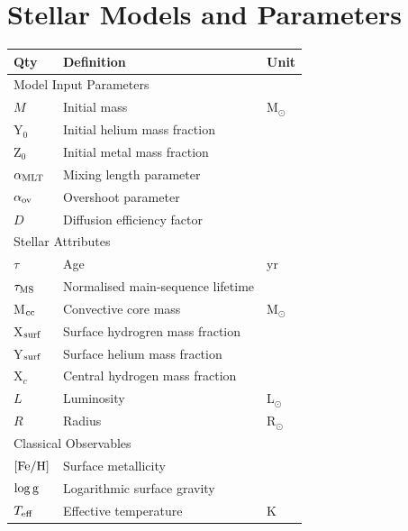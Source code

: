 \section{Stellar Models and Parameters}
\begin{table}
\centering
{
\renewcommand{\arraystretch}{1.2}
\centering
\begin{tabular}{lll} 
\hline \hline  
\textbf{Qty} & \textbf{Definition} & \textbf{Unit} \\ 
\hline
\multicolumn{3}{l}{Model Input Parameters} \\ 
$M$ & Initial mass & M$_{\odot}$ \\
Y$_0$ & Initial helium mass fraction & \\
Z$_0$ & Initial metal mass fraction & \\
$\alpha_{\rm{MLT}}$ & Mixing length parameter & \\
$\alpha_{\rm{ov}}$ & Overshoot parameter & \\ 
$D$ & Diffusion efficiency factor & \\[8pt] 
\multicolumn{3}{l}{Stellar Attributes} \\
$\tau$ & Age & yr \\
$\tau_{\rm{MS}}$ & Normalised main-sequence lifetime &  \\
M$_{\rm{cc}}$ & Convective core mass & M$_{\odot}$ \\
X$_{\rm{surf}}$ & Surface hydrogren mass fraction & \\
Y$_{\rm{surf}}$ & Surface helium mass fraction & \\
X$_c$ & Central hydrogen mass fraction & \\
$L$ & Luminosity & L$_{\odot}$ \\ 
$R$ & Radius & R$_{\odot}$ \\[8pt]
\multicolumn{3}{l}{Classical Observables} \\
$[\rm{Fe/H}]$ & Surface metallicity & \\
$\log \rm{g}$ & Logarithmic surface gravity &  \\ %
$T_{\rm{eff}}$ & Effective temperature & K \\[8pt]


\end{tabular}}
\end{table}
